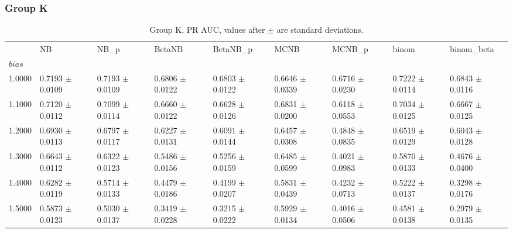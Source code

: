 \subsubsection*{Group K}
\begin{table}[H]
\centering
\begin{adjustbox}{max width=\linewidth}
\begin{tabular}{lllllllll}
\toprule
 & NB & NB\_p & BetaNB & BetaNB\_p & MCNB & MCNB\_p & binom & binom\_beta \\
$bias$ &  &  &  &  &  &  &  &  \\
\midrule
1.0000 & 0.7193 $\pm$ 0.0109 & 0.7193 $\pm$ 0.0109 & 0.6806 $\pm$ 0.0122 & 0.6803 $\pm$ 0.0122 & 0.6646 $\pm$ 0.0339 & 0.6716 $\pm$ 0.0230 & 0.7222 $\pm$ 0.0114 & 0.6843 $\pm$ 0.0116 \\
1.1000 & 0.7120 $\pm$ 0.0112 & 0.7099 $\pm$ 0.0114 & 0.6660 $\pm$ 0.0122 & 0.6628 $\pm$ 0.0126 & 0.6831 $\pm$ 0.0200 & 0.6118 $\pm$ 0.0553 & 0.7034 $\pm$ 0.0125 & 0.6667 $\pm$ 0.0125 \\
1.2000 & 0.6930 $\pm$ 0.0113 & 0.6797 $\pm$ 0.0117 & 0.6227 $\pm$ 0.0131 & 0.6091 $\pm$ 0.0144 & 0.6457 $\pm$ 0.0308 & 0.4848 $\pm$ 0.0835 & 0.6519 $\pm$ 0.0129 & 0.6043 $\pm$ 0.0128 \\
1.3000 & 0.6643 $\pm$ 0.0112 & 0.6322 $\pm$ 0.0123 & 0.5486 $\pm$ 0.0156 & 0.5256 $\pm$ 0.0159 & 0.6485 $\pm$ 0.0599 & 0.4021 $\pm$ 0.0983 & 0.5870 $\pm$ 0.0133 & 0.4676 $\pm$ 0.0400 \\
1.4000 & 0.6282 $\pm$ 0.0119 & 0.5714 $\pm$ 0.0133 & 0.4479 $\pm$ 0.0186 & 0.4199 $\pm$ 0.0207 & 0.5831 $\pm$ 0.0439 & 0.4232 $\pm$ 0.0713 & 0.5222 $\pm$ 0.0137 & 0.3298 $\pm$ 0.0176 \\
1.5000 & 0.5873 $\pm$ 0.0123 & 0.5030 $\pm$ 0.0137 & 0.3419 $\pm$ 0.0228 & 0.3215 $\pm$ 0.0222 & 0.5929 $\pm$ 0.0134 & 0.4016 $\pm$ 0.0506 & 0.4581 $\pm$ 0.0138 & 0.2979 $\pm$ 0.0135 \\
\bottomrule
\end{tabular}

\end{adjustbox}
\caption{Group K, PR AUC, values after $\pm$ are standard deviations.}
\end{table}

